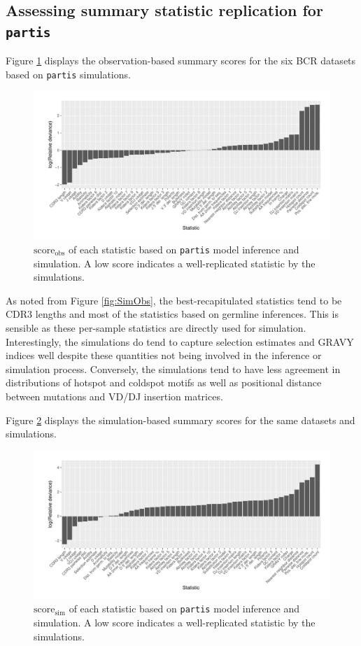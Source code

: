 \documentclass{article}
\begin{document}
\subsection*{Assessing summary statistic replication for \texttt{partis}}
Figure \ref{fig:ObsScoresBCR} displays the observation-based summary scores for the six BCR datasets based on \texttt{partis} simulations.
\begin{figure}
    \includegraphics[width=\linewidth]{Figures/obs_score_plot.pdf}
    \caption{$\text{score}_\text{obs}$ of each statistic based on \texttt{partis} model inference and simulation.
        A low score indicates a well-replicated statistic by the simulations.
    }
    \label{fig:ObsScoresBCR}
\end{figure}
As noted from Figure \ref{fig:SimObs}, the best-recapitulated statistics tend to be CDR3 lengths and most of the statistics based on germline inferences.
This is sensible as these per-sample statistics are directly used for simulation.
Interestingly, the simulations do tend to capture selection estimates and GRAVY indices well despite these quantities not being involved in the inference or simulation process.
Conversely, the simulations tend to have less agreement in distributions of hotspot and coldspot motifs as well as positional distance between mutations and VD/DJ insertion matrices.

Figure \ref{fig:SimScoresBCR} displays the simulation-based summary scores for the same datasets and simulations.
\begin{figure}
    \includegraphics[width=\linewidth]{Figures/sim_score_plot.pdf}
    \caption{$\text{score}_\text{sim}$ of each statistic based on \texttt{partis} model inference and simulation.
        A low score indicates a well-replicated statistic by the simulations.
    }
    \label{fig:SimScoresBCR}
\end{figure}
\end{document}
